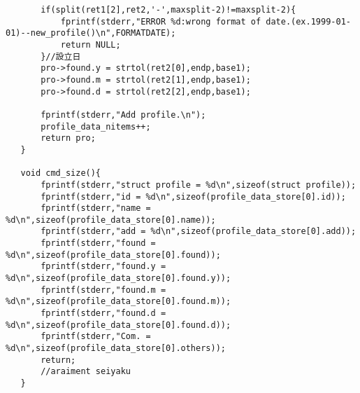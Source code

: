 \documentclass[a4j,11pt]{jarticle}
\begin{document}
\begin{lstlisting}
       if(split(ret1[2],ret2,'-',maxsplit-2)!=maxsplit-2){
           fprintf(stderr,"ERROR %d:wrong format of date.(ex.1999-01-01)--new_profile()\n",FORMATDATE);
           return NULL;
       }//設立日
       pro->found.y = strtol(ret2[0],endp,base1);
       pro->found.m = strtol(ret2[1],endp,base1);
       pro->found.d = strtol(ret2[2],endp,base1);
       
       fprintf(stderr,"Add profile.\n");
       profile_data_nitems++;
       return pro;
   }
   
   void cmd_size(){
       fprintf(stderr,"struct profile = %d\n",sizeof(struct profile));
       fprintf(stderr,"id = %d\n",sizeof(profile_data_store[0].id));
       fprintf(stderr,"name = %d\n",sizeof(profile_data_store[0].name));
       fprintf(stderr,"add = %d\n",sizeof(profile_data_store[0].add));
       fprintf(stderr,"found = %d\n",sizeof(profile_data_store[0].found));
       fprintf(stderr,"found.y = %d\n",sizeof(profile_data_store[0].found.y));
       fprintf(stderr,"found.m = %d\n",sizeof(profile_data_store[0].found.m));
       fprintf(stderr,"found.d = %d\n",sizeof(profile_data_store[0].found.d));
       fprintf(stderr,"Com. = %d\n",sizeof(profile_data_store[0].others));
       return;
       //araiment seiyaku
   }
\end{lstlisting}
\end{document}
